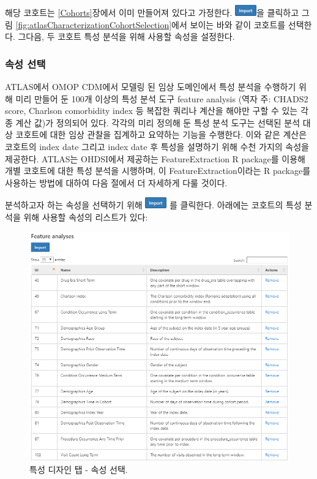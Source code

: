 \documentclass[10.5pt]{book}
\theoremstyle{definition}
\theoremstyle{definition}
\theoremstyle{definition}
\theoremstyle{remark}
\begin{document}
해당 코호트는 \ref{Cohorts}장에서 이미 만들어져 있다고 가정한다.
\includegraphics{images/Characterization/atlasImportButton.png}을
클릭하고 그림 \ref{fig:atlasCharacterizationCohortSelection}에서 보이는
바와 같이 코호트를 선택한다. 그다음, 두 코호트 특성 분석을 위해 사용할
속성을 설정한다.

\subsubsection*{속성 선택}\label{-}

ATLAS에서 OMOP CDM에서 모델링 된 임상 도메인에서 특성 분석을 수행하기
위해 미리 만들어 둔 100개 이상의 특성 분석 도구 feature analysis (역자
주: CHADS2 score, Charlson comorbidity index 등 복잡한 쿼리나 계산을
해야만 구할 수 있는 각종 계산 값)가 정의되어 있다. 각각의 미리 정의해 둔
특성 분석 도구는 선택된 분석 대상 코호트에 대한 임상 관찰을 집계하고
요약하는 기능을 수행한다. 이와 같은 계산은 코호트의 index date 그리고
index date 후 특성을 설명하기 위해 수천 가지의 속성을 제공한다. ATLAS는
OHDSI에서 제공하는 FeatureExtraction R package를 이용해 개별 코호트에
대한 특성 분석을 시행하며, 이 FeatureExtraction이라는 R package를
사용하는 방법에 대하여 다음 절에서 더 자세하게 다룰 것이다.

분석하고자 하는 속성을 선택하기 위해
\includegraphics{images/Characterization/atlasImportButton.png} 를
클릭한다. 아래에는 코호트의 특성 분석을 위해 사용할 속성의 리스트가
있다:

\begin{figure}

{\centering \includegraphics[width=1\linewidth]{images/Characterization/atlasCharacterizationFeatureSelection} 

}

\caption{특성 디자인 탭 - 속성 선택.}\label{fig:atlasCharacterizationFeatureSelection}
\end{figure}
\end{document}
